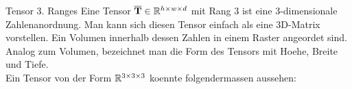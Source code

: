 \begin{defbox}{Tensor 3. Ranges}
  Eine Tensor $\overline{\mathbf{T}} \in \mathbb{R}^{h \times w \times d}$ mit Rang 3 ist eine 3-dimensionale Zahlenanordnung. Man kann sich
  diesen Tensor einfach als eine 3D-Matrix vorstellen. Ein Volumen innerhalb
  dessen Zahlen in einem Raster angeordet sind.
  Analog zum Volumen, bezeichnet man die Form des Tensors mit Hoehe, Breite und
  Tiefe. \\
  Ein Tensor von der Form $\mathbb{R}^{3 \times 3 \times 3}$ koennte folgendermassen
  aussehen:
  \para{}








\end{defbox}

